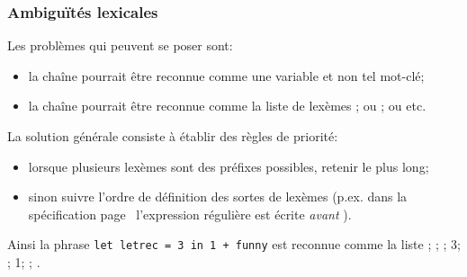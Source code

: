 %
\begin{frame}
\frametitle{Ambiguïtés lexicales}

Les problèmes qui peuvent se poser sont:

\begin{itemize}

  \item la chaîne  pourrait être reconnue comme une
  variable et non tel mot-clé;

  \item la chaîne  pourrait être reconnue comme la liste
  de lexèmes \lbra\Tlet; \Tident {}\rbra{} ou \lbra\Tlet;
  \Trec\rbra{} ou \lbra\Tident {}\rbra{} etc.

\end{itemize}

La solution générale consiste à établir des règles de priorité:

\begin{itemize}

  \item lorsque plusieurs lexèmes sont des préfixes possibles,
  retenir le plus long;

  \item sinon suivre l'ordre de définition des sortes de lexèmes
  (p.ex. dans la spécification page~\pageref{exemple_ocamllex}
  l'expression régulière  est écrite \emph{avant}
  ).

\end{itemize}
Ainsi la phrase \texttt{let letrec = 3 in 1 + funny} est reconnue
comme la liste \lbra\Tlet; \Tident {}; \Tequal; \Tint
\num{3}; \Tin; \Tint \num{1}; \Tplus; \Tident {}\rbra.

\end{frame}

